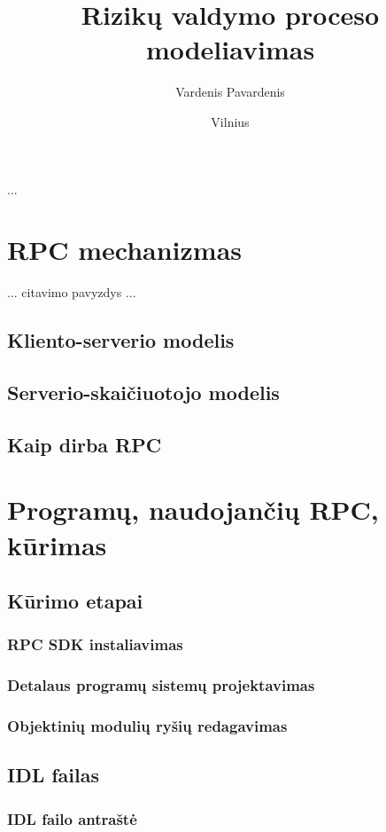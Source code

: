 \documentclass[12pt, a4paper, lithuanian]{article}
\title{Rizikų valdymo proceso modeliavimas}
\author{Vardenis Pavardenis}
\date{Vilnius\\ \the\year}
\begin{document}
\maketitle

\tableofcontents

...

\section{RPC mechanizmas}
... citavimo pavyzdys \cite{Banerjee1997} ...

\subsection{Kliento-serverio modelis}
\subsection{Serverio-skaičiuotojo modelis}
\subsection{Kaip dirba RPC}

\section{Programų, naudojančių RPC, kūrimas}
\subsection{Kūrimo etapai}
\subsubsection{RPC SDK instaliavimas}
\subsubsection{Detalaus programų sistemų projektavimas}
\subsubsection{Objektinių modulių ryšių redagavimas}
\subsection{IDL failas}
\subsubsection{IDL failo antraštė}
\end{document}
